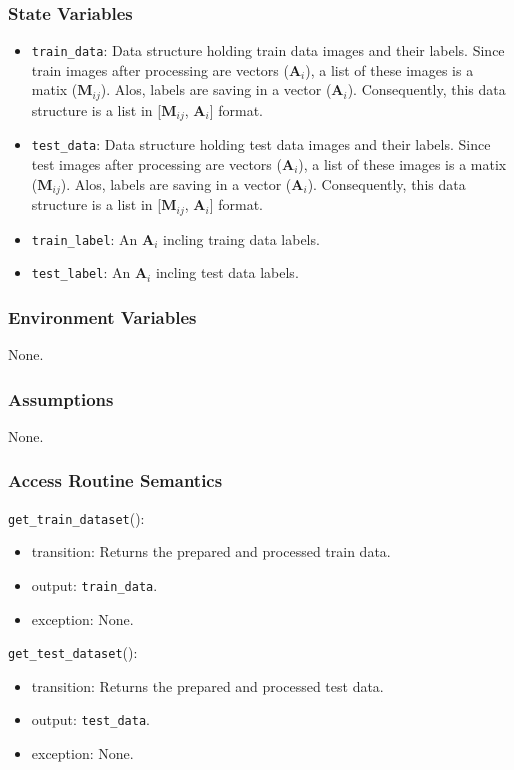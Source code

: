 \documentclass[12pt, titlepage]{article}
\def\code#1{\texttt{#1}}
\begin{document}
\subsubsection{State Variables}
\begin{itemize}
  \item \code{train\_data}: Data structure holding train data images and their labels. 
  Since train images after processing are vectors ($\mathbf{A}_{i}$), a list of these images is 
  a matix ($\mathbf{M}_{ij}$). Alos, labels are saving in a vector ($\mathbf{A}_{i}$). 
  Consequently, this data structure is a list in [$\mathbf{M}_{ij}$, $\mathbf{A}_{i}$] format.
  \item \code{test\_data}: Data structure holding test data images and their labels. 
  Since test images after processing are vectors ($\mathbf{A}_{i}$), a list of these images is 
  a matix ($\mathbf{M}_{ij}$). Alos, labels are saving in a vector ($\mathbf{A}_{i}$). 
  Consequently, this data structure is a list in [$\mathbf{M}_{ij}$, $\mathbf{A}_{i}$] format.
  \item \code{train\_label}: An $\mathbf{A}_{i}$ incling traing data labels.
  \item \code{test\_label}: An $\mathbf{A}_{i}$ incling test data labels.
\end{itemize}

\subsubsection{Environment Variables}
None.

\subsubsection{Assumptions}
None.

\subsubsection{Access Routine Semantics}

\noindent \code{get\_train\_dataset}():
\begin{itemize}
  \item transition: Returns the prepared and processed train data.
  \item output: \code{train\_data}.
  \item exception: None.
\end{itemize}

\noindent \code{get\_test\_dataset}():
\begin{itemize}
  \item transition: Returns the prepared and processed test data.
  \item output: \code{test\_data}.
  \item exception: None.
\end{itemize}
\end{document}
